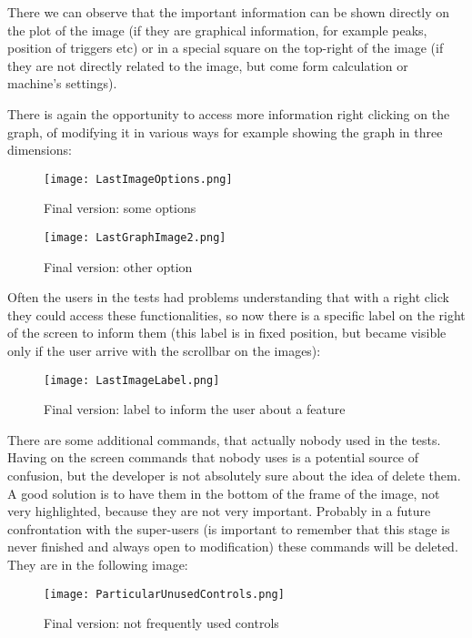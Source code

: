 There we can observe that the important information can be shown directly on the plot of the image (if they are graphical information, for example peaks, position of triggers etc) or in a special square on the top-right of the image (if they are not directly related to the image, but come form calculation or machine's settings).

\newpage

There is again the opportunity to access more information right clicking on the graph, of modifying it in various ways for example showing the graph in three dimensions: 

\begin{figure}[H]
\centering
\texttt{[image: LastImageOptions.png]} 
\caption{Final version: some options}
\end{figure}  

\begin{figure}[H]
\centering
\texttt{[image: LastGraphImage2.png]} 
\caption{Final version: other option}
\end{figure}  

Often the users in the tests had problems understanding that with a right click they could access these functionalities, so now there is a specific label on the right of the screen to inform them (this label is in fixed position, but became visible only if the user arrive with the scrollbar on the images):

\begin{figure}[H]
\centering
\texttt{[image: LastImageLabel.png]} 
\caption{Final version: label to inform the user about a feature}
\end{figure} 

There are some additional commands, that actually nobody used in the tests. Having on the screen commands that nobody uses is a potential source of confusion, but the developer is not absolutely sure about the idea of delete them. A good solution is to have them in the bottom of the frame of the image, not very highlighted, because they are not very important. Probably in a future confrontation with the super-users (is important to remember that this stage is never finished and always open to modification) these commands will be deleted.
They are in the following image:

\begin{figure}[H]
\centering
\texttt{[image: ParticularUnusedControls.png]} 
\caption{Final version: not frequently used controls}
\end{figure}  